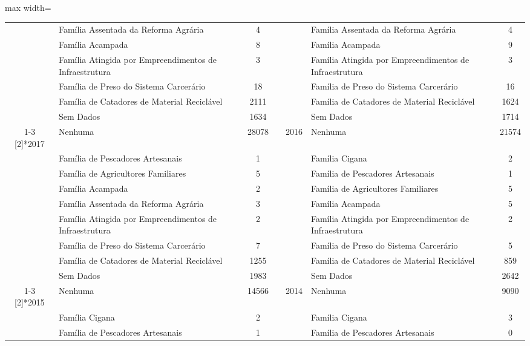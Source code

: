 \documentclass[14pt]{extarticle}
\begin{document}
\begin{table}[htbp]
\begin{adjustbox}{max width=\linewidth}
\begin{tabular}{clcrclc}
         & Família Assentada da Reforma Agrária & 4    &      &      & Família Assentada da Reforma Agrária & 4 \\
         & Família Acampada & 8    &      &      & Família Acampada & 9 \\
         & Família Atingida por Empreendimentos de Infraestrutura & 3    &      &      & Família Atingida por Empreendimentos de Infraestrutura & 3 \\
         & Família de Preso do Sistema Carcerário & 18   &      &      & Família de Preso do Sistema Carcerário & 16 \\
         & Família de Catadores de Material Reciclável & 2111 &      &      & Família de Catadores de Material Reciclável & 1624 \\
         & Sem Dados & 1634 &      &      & Sem Dados & 1714 \\
\cmidrule{1-3}\cmidrule{5-7}    \multirow{9}[2]{*}{2017} & Nenhuma & 28078 &      & \multirow{9}[2]{*}{2016} & Nenhuma & 21574 \\
         & Família de Pescadores Artesanais & 1    &      &      & Família Cigana & 2 \\
         & Família de Agricultores Familiares & 5    &      &      & Família de Pescadores Artesanais & 1 \\
         & Família Acampada & 2    &      &      & Família de Agricultores Familiares & 5 \\
         & Família Assentada da Reforma Agrária & 3    &      &      & Família Acampada & 5 \\
         & Família Atingida por Empreendimentos de Infraestrutura & 2    &      &      & Família Atingida por Empreendimentos de Infraestrutura & 2 \\
         & Família de Preso do Sistema Carcerário & 7    &      &      & Família de Preso do Sistema Carcerário & 5 \\
         & Família de Catadores de Material Reciclável & 1255 &      &      & Família de Catadores de Material Reciclável & 859 \\
         & Sem Dados & 1983 &      &      & Sem Dados & 2642 \\
\cmidrule{1-3}\cmidrule{5-7}    \multirow{9}[2]{*}{2015} & Nenhuma & 14566 &      & \multirow{9}[2]{*}{2014} & Nenhuma & 9090 \\
         & Família Cigana & 2    &      &      & Família Cigana & 3 \\
         & Família de Pescadores Artesanais & 1    &      &      & Família de Pescadores Artesanais & 0 \\

\end{tabular}
\end{adjustbox}
\end{table}
\end{document}
